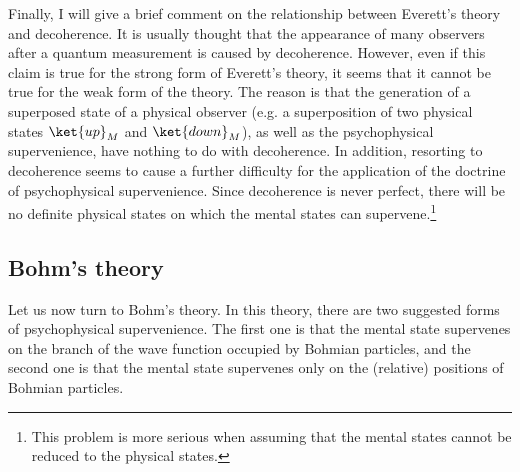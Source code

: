 Finally, I will give a brief comment on the relationship between Everett's theory and decoherence. It is usually thought that the appearance of many observers after a quantum measurement is caused by decoherence. 
However, even if this claim is true for the strong form of Everett's theory, it seems that it cannot be true for the weak form of the theory. %
The reason is that the generation of a superposed state of a physical observer (e.g. a superposition of two physical states  $\ket{up}_M$ and $\ket{down}_M$), as well as the psychophysical supervenience, have nothing to do with decoherence. In addition, resorting to decoherence seems to cause a further difficulty for the application of the doctrine of psychophysical supervenience. Since decoherence is never perfect, there will be no definite physical states on which the mental states can supervene.\footnote{This problem is more serious when assuming that the mental states cannot be reduced to the physical states.} %



\subsection{Bohm's theory}
Let us now turn to Bohm's theory. In  this theory, there are two suggested forms of psychophysical supervenience. 
The first one is that the mental state supervenes on the branch of the wave function occupied by Bohmian particles, and the second one is that the mental state supervenes only on the (relative) positions of Bohmian particles.

